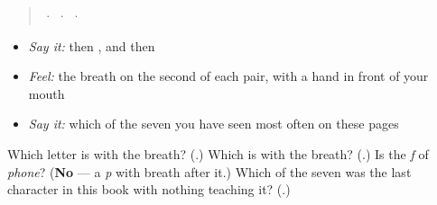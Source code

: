 \begin{quote}
  ·    ·    ·  
\end{quote}

\begin{itemize}
\raggedright
  \item \emph{Say it:}  then , and  then 
  \item \emph{Feel:} the breath on the second of each pair, with a hand in front of your mouth
  \item \emph{Say it:} which of the seven you have seen most often on these pages
\end{itemize}

\begin{tcolorbox}[breakable,colback=teal!4,colframe=teal!35!black,title={Before you move on}]
Which letter is  with the breath? (\textbf{}.) Which is  with the breath? (\textbf{}.) Is  the \emph{f} of \emph{phone}? (\textbf{No} — a \emph{p} with breath after it.) Which of the seven was the last character in this book with nothing teaching it? (\textbf{}.)
\end{tcolorbox}
